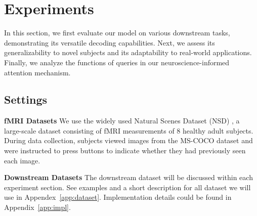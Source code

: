 \section{Experiments}
In this section, we first evaluate our model on various downstream tasks, demonstrating its versatile decoding capabilities. Next, we assess its generalizability to novel subjects and its adaptability to real-world applications. Finally, we analyze the functions of queries in our neuroscience-informed attention mechanism.

\subsection{Settings}

\noindent\textbf{fMRI Datasets} 
We use the widely used Natural Scenes Dataset (NSD) \cite{allen2022massive}, a large-scale dataset consisting of fMRI measurements of $8$ healthy adult subjects. During data collection, subjects viewed images from the MS-COCO dataset \cite{lin2014microsoft} and were instructed to press buttons to indicate whether they had previously seen each image.


\noindent\textbf{Downstream Datasets} The downstream dataset will be discussed within each experiment section. See examples and a short description for all dataset we will use in Appendex~\ref{app:dataset}.
Implementation details could be found in Appendix~\ref{app:impl}.


